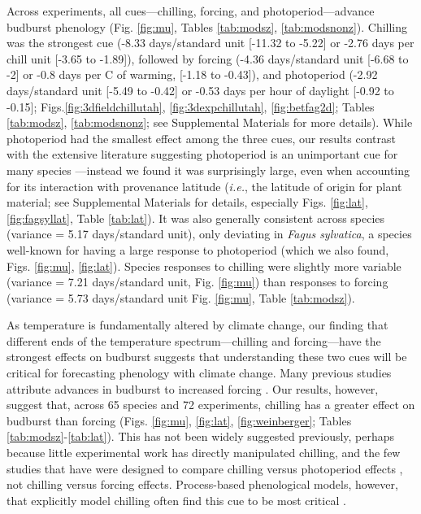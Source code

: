 \documentclass{article}
\newcommand{\R}[1]{\label{#1}\linelabel{#1}}
\begin{document}
\par Across experiments\R{ee5}, all cues---chilling, forcing, and photoperiod---advance budburst phenology (Fig. \ref{fig:mu}, Tables \ref{tab:modsz}, \ref{tab:modsnonz}). Chilling was the strongest cue (-8.33 days/standard unit [-11.32 to -5.22] or -2.76 days per chill unit [-3.65 to -1.89]), followed by forcing (-4.36 days/standard unit [-6.68 to -2] or -0.8 days per \degree C of warming, [-1.18 to -0.43]), and photoperiod (-2.92 days/standard unit [-5.49 to -0.42] or -0.53 days per hour of daylight [-0.92 to  -0.15]; Figs.\ref{fig:3dfieldchillutah}, \ref{fig:3dexpchillutah}, \ref{fig:betfag2d}; Tables \ref{tab:modsz}, \ref{tab:modsnonz}; see Supplemental Materials for more details). While photoperiod had the smallest effect among the three cues, our results contrast with the extensive literature suggesting photoperiod is an unimportant cue for many species \emph{\citep{zohner2016,fu2019}}---instead we found it was surprisingly large, even when accounting for its interaction with provenance latitude (\emph{i.e.}, the latitude of origin for plant material; see Supplemental Materials for details, especially Figs. \ref{fig:lat}, \ref{fig:fagsyllat}, Table \ref{tab:lat}). It was also generally consistent across species (variance = 5.17 days/standard unit), only deviating in \emph{Fagus sylvatica}, a species well-known for having a large response to photoperiod (which we also found, Figs. \ref{fig:mu}, \ref{fig:lat}). Species responses to chilling were slightly more variable (variance = 7.21 days/standard unit, Fig. \ref{fig:mu}) than responses to forcing (variance = 5.73 days/standard unit Fig. \ref{fig:mu}, Table \ref{tab:modsz}). 

\par As temperature is fundamentally altered by climate change, our finding that different ends of the temperature spectrum---chilling and forcing---have the strongest effects on budburst suggests that understanding these two cues will be critical for forecasting phenology with climate change. Many previous studies attribute advances in budburst to increased forcing \emph{\citep{menzel2006,harrington2015,Basler:2014aa,bradley1999}}. Our results, however, suggest that, across 65 species and 72 experiments\R{ee6}, chilling has a greater effect on budburst than forcing (Figs. \ref{fig:mu}, \ref{fig:lat}, \ref{fig:weinberger}; Tables \ref{tab:modsz}-\ref{tab:lat}). \R{eeXstart}This has not been widely suggested previously, perhaps because little experimental work has directly manipulated chilling, and the few studies that have were designed to compare chilling versus photoperiod effects \emph{\citep[e.g.,][]{zohner2016,Basler:2014aa,Caffarra:2011qf,Laube:2014a}}, not chilling versus forcing effects. Process-based phenological models, however, that explicitly model chilling often find this cue to be most critical \emph{\citep[e.g.,][]{gauzere2019,Laube:2014a,Heide:2005aa}}.\R{eeXend}
\end{document}
